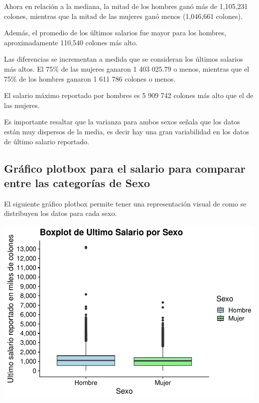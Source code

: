\documentclass[
]{article}
\begin{document}
Ahora en relación a la mediana, la mitad de los hombres ganó más de
1,105,231 colones, mientras que la mitad de las mujeres ganó menos
(1,046,661 colones).

Además, el promedio de los últimos salarios fue mayor para los hombres,
aproximadamente 110,540 colones más alto.

Las diferencias se incrementan a medida que se consideran los últimos
salarios más altos. El 75\% de las mujeres ganaron 1 403 025.79 o menos,
mientras que el 75\% de los hombres ganaron 1 611 786 colones o menos.

El salario máximo reportado por hombres es 5 909 742 colones más alto
que el de las mujeres.

Es importante resaltar que la varianza para ambos sexos señala que los
datos están muy dispersos de la media, es decir hay una gran
variabilidad en los datos de último salario reportado.

\newpage

\hypertarget{gruxe1fico-plotbox-para-el-salario-para-comparar-entre-las-categoruxedas-de-sexo}{%
\subsection{Gráfico plotbox para el salario para comparar entre las
categorías de
Sexo}\label{gruxe1fico-plotbox-para-el-salario-para-comparar-entre-las-categoruxedas-de-sexo}}

El siguiente gráfico plotbox permite tener una representación visual de
como se distribuyen los datos para cada sexo.

\includegraphics{Tarea1_files/figure-latex/unnamed-chunk-7-1.pdf}
\end{document}
